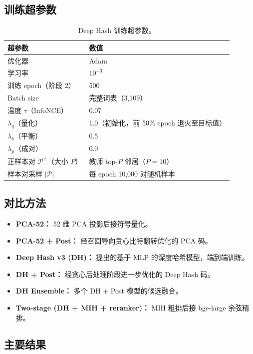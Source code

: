 \documentclass[11pt,a4paper]{article}
\begin{document}
\subsection{训练超参数}

\begin{table}[htbp]
\centering
\caption{Deep Hash 训练超参数。}
\label{tab:hyperparams-cn}
\begin{tabular}{ll}
\toprule
\textbf{超参数} & \textbf{数值} \\
\midrule
优化器 & Adam \\
学习率 & $10^{-3}$ \\
训练 epoch（阶段 2） & 500 \\
Batch size & 完整词表（3,109） \\
温度 $\tau$（InfoNCE） & 0.07 \\
$\lambda_q$（量化） & 1.0（初始化，前 50\% epoch 退火至目标值） \\
$\lambda_b$（平衡） & 0.5 \\
$\lambda_p$（成对） & 0.0 \\
正样本对 $\mathcal{P}^+$（大小 $P$） & 教师 top-$P$ 邻居（$P=10$） \\
样本对采样 $|\mathcal{P}|$ & 每 epoch 10,000 对随机样本 \\
\bottomrule
\end{tabular}
\end{table}

\subsection{对比方法}

\begin{itemize}[leftmargin=*]
    \item \textbf{PCA-52：} 52 维 PCA 投影后接符号量化。
    \item \textbf{PCA-52 + Post：} 经召回导向贪心比特翻转优化的 PCA 码。
    \item \textbf{Deep Hash v3 (DH)：} 提出的基于 MLP 的深度哈希模型，端到端训练。
    \item \textbf{DH + Post：} 经贪心后处理阶段进一步优化的 Deep Hash 码。
    \item \textbf{DH Ensemble：} 多个 DH + Post 模型的候选融合。
    \item \textbf{Two-stage (DH + MIH + reranker)：} MIH 粗排后接 bge-large 余弦精排。
\end{itemize}

\subsection{主要结果}
\end{document}
